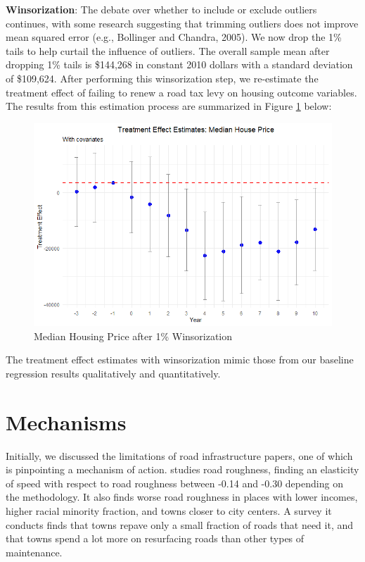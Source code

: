 \textbf{Winsorization}: The debate over whether to include or exclude outliers continues, with some research suggesting that trimming outliers does not improve mean squared error (e.g., Bollinger and Chandra, 2005).  We now drop the 1\% tails to help curtail the influence of outliers. The overall sample mean after dropping 1\% tails is \$144,268 in constant 2010 dollars with a standard deviation of \$109,624. After performing this winsorization step, we re-estimate the treatment effect of failing to renew a road tax levy on housing outcome variables. The results from this estimation process are summarized in Figure \ref{fig:tes_g_w} below:

\begin{figure}[htbp]
    \centering
    \includegraphics[width=\textwidth,keepaspectratio]{images/tes_g_w_reg.png}    
    \caption{Median Housing Price after 1\% Winsorization}
    \label{fig:tes_g_w}
\end{figure}

The treatment effect estimates with winsorization mimic those from our baseline regression results qualitatively and quantitatively.

\section{Mechanisms} \label{sec:mech}

Initially, we discussed the limitations of road infrastructure papers, one of which is pinpointing a mechanism of action. \cite{currier2023} studies road roughness, finding an elasticity of speed with respect to road roughness between -0.14 and -0.30 depending on the methodology.  It also finds worse road roughness in places with lower incomes, higher racial minority fraction, and towns closer to city centers. A survey it conducts finds that towns repave only a small fraction of roads that need it, and that towns spend a lot more on resurfacing roads than other types of maintenance.

